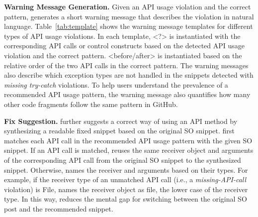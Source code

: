 {\bf Warning Message Generation.} Given an API usage violation and the correct pattern, {\tool} generates a short warning message that describes the violation in natural language. Table~\ref{tab:template} shows the warning message templates for different types of API usage violations. In each template, {\textless?\textgreater} is instantiated with the corresponding API calls or control constructs based on the detected API usage violation and the correct pattern. {\textless before/after\textgreater} is instantiated based on the relative order of the two API calls in the correct pattern. The warning messages also describe which exception types are not handled in the snippets detected with {\em missing try-catch} violations. To help users understand the prevalence of a recommended API usage pattern, the warning message also quantifies how many other code fragments follow the same pattern in GitHub. 

{\bf Fix Suggestion.} {\tool} further suggests a correct way of using an API method by synthesizing a readable fixed snippet based on the original SO snippet. {\tool} first matches each API call in the recommended API usage pattern with the given SO snippet. If an API call is matched, {\tool} reuses the same receiver object and arguments of the corresponding API call from the original SO snippet to the synthesized snippet. Otherwise, {\tool} names the receiver and arguments based on their types. For example, if the receiver type of an unmatched API call (i.e., a {\em missing-API-call} violation) is {\ttt File}, {\tool} names the receiver object as {\ttt file}, the lower case of the receiver type. In this way, {\tool} reduces the mental gap for switching between the original SO post and the recommended snippet.

